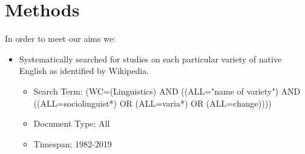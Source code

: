 \documentclass[a0paper,fleqn]{betterposter}
\begin{document}
{\section{Methods}

In order to meet our aims we:
\begin{itemize}
	\item Systematically searched for studies on each particular variety of native English as identified by Wikipedia.
	\begin{itemize}
		\item Search Term: (WC=(Linguistics)  AND  ((ALL="name of variety")  AND  ((ALL=sociolinguist*)  OR  (ALL=varia*)  OR  (ALL=change))))
		\item Document Type: All
		\item Timespan: 1982-2019 
	\end{itemize}
\end{itemize}
}
\end{document}
